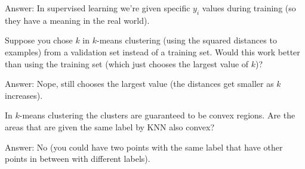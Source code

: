 \documentclass{article}
\def\ans#1{\par\gre{Answer: #1}}
\def\gre#1{{\color{gre}#1}}
\begin{document}
{		\ans{In supervised learning we're given specific $y_i$ values during training (so they have a meaning in the real world).}
		\item Suppose you chose $k$ in $k$-means clustering (using the squared distances to examples) from a validation set instead of a training set. Would this work better than using the training set (which just chooses the largest value of $k$)?
		\ans{Nope, still chooses the largest value (the distances get smaller as $k$ increases).}
		\item In $k$-means clustering the clusters are guaranteed to be convex regions. Are the areas that are given the same label by KNN also convex?
		\ans{No (you could have two points with the same label that have other points in between with different labels).}
	}
	
	
	
\end{document}
